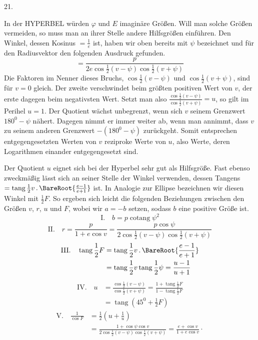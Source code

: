 \par{}
\begin{center}
\hypertarget{native-038-article021}{}21.
\end{center}
In der HYPERBEL würden $\varphi$ und $E$ imaginäre Größen. Will man solche Größen vermeiden, so muss man an ihrer Stelle andere Hilfsgrößen einführen. Den Winkel, dessen Kosinus $=\frac{1}{e}$ ist, haben wir oben bereits mit $\psi$ bezeichnet und für den Radiusvektor den folgenden Ausdruck gefunden.
\[
=\frac{p}{2e\cos\frac{1}{2}(v-\psi)\cos\frac{1}{2}(v+\psi)}
\]
Die Faktoren im Nenner dieses Bruchs, $\cos\frac{1}{2}(v-\psi)$ und $\cos\frac{1}{2}(v+\psi)$, sind für $v=0$ gleich. Der zweite verschwindet beim größten positiven Wert von $v$, der erste dagegen beim negativsten Wert. Setzt man also $\frac{\cos\frac{1}{2}(v-\psi)}{\cos\frac{1}{2}(v+\psi)}=u$, so gilt im Perihel $u=1$. Der Quotient wächst unbegrenzt, wenn sich $v$ seinem Grenzwert $180^0-\psi$ nähert. Dagegen nimmt er immer weiter ab, wenn man annimmt, dass $v$ zu seinem anderen Grenzwert $-(180^0-\psi)$ zurückgeht. Somit entsprechen entgegengesetzten Werten von $v$ reziproke Werte von $u$, also Werte, deren Logarithmen einander entgegengesetzt sind.

Der Quotient $u$ eignet sich bei der Hyperbel sehr gut als Hilfsgröße. Fast ebenso zweckmäßig lässt sich an seiner Stelle der Winkel verwenden, dessen Tangens $=\operatorname{tang}\frac{1}{2}v\, .\,\BareRoot{\frac{e-1}{e+1}}$ ist. In Analogie zur Ellipse bezeichnen wir diesen Winkel mit $\frac{1}{2}F$. So ergeben sich leicht die folgenden Beziehungen zwischen den Größen $v$, $r$, $u$ und $F$, wobei wir $a=-b$ setzen, sodass $b$ eine positive Größe ist.
\[
\mathrm{I.}\quad b=p\operatorname{cotang}\psi^2
\]
\[
\mathrm{II.}\quad r=\frac{p}{1+e\cos v}=\frac{p\cos\psi}{2\cos\frac{1}{2}(v-\psi)\cos\frac{1}{2}(v+\psi)}
\]
\[
\begin{aligned}
\mathrm{III.}\quad\operatorname{tang}\frac{1}{2}F&=\operatorname{tang}\frac{1}{2}v\, .\,\BareRoot{\frac{e-1}{e+1}}\\
&=\operatorname{tang}\frac{1}{2}v\operatorname{tang}\frac{1}{2}\psi=\frac{u-1}{u+1}
\end{aligned}
\]
\[
\begin{aligned}
\mathrm{IV.}\quad u&=\frac{\cos\frac{1}{2}(v-\psi)}{\cos\frac{1}{2}(v+\psi)}=\frac{1+\operatorname{tang}\frac{1}{2}F}{1-\operatorname{tang}\frac{1}{2}F}\\
&=\operatorname{tang}(45^0+\frac{1}{2}F)
\end{aligned}
\]
\[
\begin{aligned}
\mathrm{V.}\quad\frac{1}{\cos F}&=\frac{1}{2}\left(u+\frac{1}{u}\right)\\
&=\frac{1+\cos\psi\cos v}{2\cos\frac{1}{2}(v-\psi)\cos\frac{1}{2}(v+\psi)}=\frac{e+\cos v}{1+e\cos v}\cdot
\end{aligned}
\]

